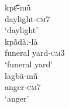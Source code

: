 \documentclass[output=paper]{langscibook}
\begin{document}
 \begin{exe}\setlength{\multicolsep}{0pt}
    \ex \label{ex:traore:14}
     \begin{multicols}{2}
        \begin{xlist}
            \ex \gll kpɛ̃̄-mũ̀   \\
                daylight-\textsc{cm}7\\
                \trans `daylight'\\
            \ex \gll kpã̀dàː-là\\
               {funeral yard-\textsc{cm}3}\\
              \trans `funeral yard'\\
             \ex \gll lāgbã̄-mũ̄ \\
                anger-\textsc{cm7}\\
                \trans `anger'\\
        \end{xlist}
     \end{multicols}
 \end{exe}
 
\end{document}
